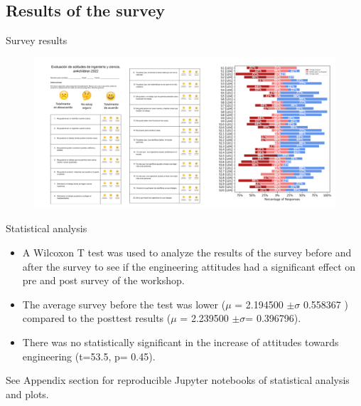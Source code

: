 \subsection{Results of the survey}

{


\begin{frame}{Survey results}
      \begin{figure}
        \centering
        \includegraphics[width=1.0\textwidth]{./figures/survey-results/outputs/drawing-v00.png}
      \end{figure}
\end{frame}
}



{

\begin{frame}{Statistical analysis}

\begin{itemize}
\item A Wilcoxon T test was used to analyze the results of the survey before and after the survey to see if the engineering attitudes had a significant effect on pre and post survey of the workshop.
\item The average survey before the test was lower ($\mu$ = 2.194500 $\pm \sigma$ 0.558367 ) compared to the posttest results ($\mu$ = 2.239500 $\pm \sigma$= 0.396796).
\item There was no statistically significant in the increase of attitudes towards engineering (t=53.5, p= 0.45).
\end{itemize}

See Appendix section for reproducible Jupyter notebooks of statistical analysis and plots.

\end{frame}
}




